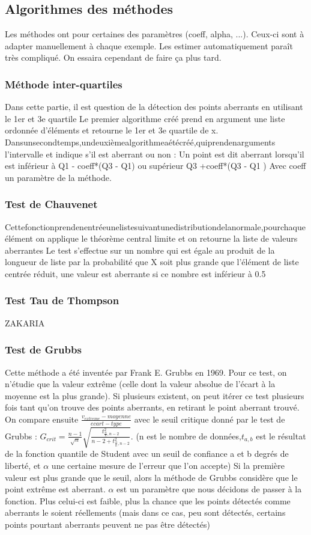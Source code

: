 \documentclass[a4paper,12pt]{article} %
\begin{document}
\subsection{Algorithmes des méthodes}
Les méthodes ont pour certaines des paramètres (coeff, alpha, ...). Ceux-ci sont à adapter manuellement à chaque exemple.
Les estimer automatiquement paraît très compliqué. On essaira cependant de faire ça plus tard.

\subsubsection{Méthode inter-quartiles}
Dans cette partie, il est question de la détection des points aberrants en utilisant le 1er et 3e quartile Le premier algorithme créé prend en argument une liste ordonnée d’éléments et retourne le 1er et 3e quartile de x. Dansunsecondtemps,undeuxièmealgorithmeaétécréé,quiprendenarguments l'intervalle et indique s'il est aberrant ou non : Un point est dit aberrant lorsqu’il est inférieur à Q1 - coeff*(Q3 - Q1) ou supérieur Q3 +coeff*(Q3 - Q1 )
Avec coeff un paramètre de la méthode.

\subsubsection{Test de Chauvenet}
Cettefonctionprendenentréeunelistesuivantunedistributiondelanormale,pourchaque élément on applique le théorème central limite et on retourne la liste de valeurs aberrantes Le test s’eﬀectue sur un nombre qui est égale au produit de la longueur de liste par la probabilité que X soit plus grande que l’élément de liste centrée réduit, une valeur est aberrante si ce nombre est inférieur à 0.5

\subsubsection{Test Tau de Thompson}
ZAKARIA
\subsubsection{Test de Grubbs}
Cette méthode a été inventée par Frank E. Grubbs en 1969. Pour ce test, on n’étudie que la valeur extrême (celle dont la valeur absolue de l’écart à la moyenne est la plus grande). Si plusieurs existent, on peut itérer ce test plusieurs fois tant qu’on trouve des points aberrants, en retirant le point aberrant trouvé. On compare ensuite $\frac{v_{extreme}-moyenne}{ecart-type}$ avec le seuil critique donné par le test de Grubbs : $G_{crit} = \frac{n-1}{\sqrt{n}}\sqrt{\frac{t^2_{\frac{\alpha}{n},n-2}}{n-2+t^2_{\frac{\alpha}{n},n-2}}}$. (n est le nombre de données,$t_{a,b}$ est le résultat de la fonction quantile de Student avec un seuil de conﬁance a et b degrés de liberté, et $\alpha$ une certaine mesure de l’erreur que l’on accepte) Si la première valeur est plus grande que le seuil, alors la méthode de Grubbs considère que le point extrême est aberrant. $\alpha$ est un paramètre que nous décidons de passer à la fonction. Plus celui-ci est faible, plus la chance que les points détectés comme aberrants le soient réellements (mais dans ce cas, peu sont détectés, certains points pourtant aberrants peuvent ne pas être détectés)
\end{document}
